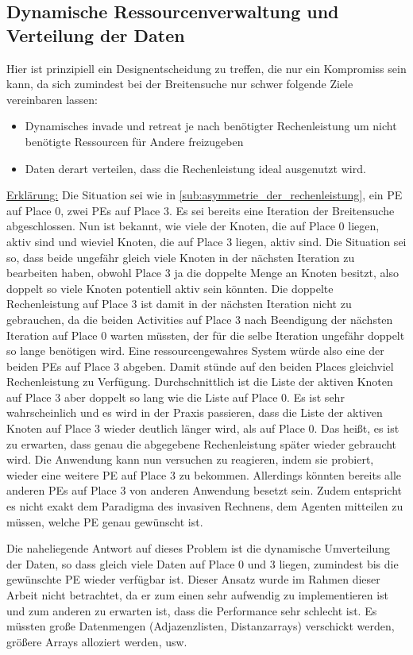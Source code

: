 \subsection{Dynamische Ressourcenverwaltung und Verteilung der Daten} %
\label{sub:dynamische_ressourcenverwaltung}
Hier ist prinzipiell ein Designentscheidung zu treffen, die nur ein Kompromiss sein kann, da sich zumindest bei der Breitensuche nur schwer folgende Ziele vereinbaren lassen:
\begin{itemize}
	\item Dynamisches invade und retreat je nach benötigter Rechenleistung um nicht benötigte Ressourcen für Andere freizugeben
	\item Daten derart verteilen, dass die Rechenleistung ideal ausgenutzt wird.
\end{itemize}
\underline{Erklärung:} Die Situation sei wie in \ref{sub:asymmetrie_der_rechenleistung}, ein PE auf Place 0, zwei PEs auf Place 3. Es sei bereits eine Iteration der Breitensuche abgeschlossen. Nun ist bekannt, wie viele der Knoten, die auf Place 0 liegen, aktiv sind und wieviel Knoten, die auf Place 3 liegen, aktiv sind. Die Situation sei so, dass beide ungefähr gleich viele Knoten in der nächsten Iteration zu bearbeiten haben, obwohl Place 3 ja die doppelte Menge an Knoten besitzt, also doppelt so viele Knoten potentiell aktiv sein könnten. Die doppelte Rechenleistung auf Place 3 ist damit in der nächsten Iteration nicht zu gebrauchen, da die beiden Activities auf Place 3 nach Beendigung der nächsten Iteration auf Place 0 warten müssten, der für die selbe Iteration ungefähr doppelt so lange benötigen wird. Eine ressourcengewahres System würde also eine der beiden PEs auf Place 3 abgeben. Damit stünde auf den beiden Places gleichviel Rechenleistung zu Verfügung. Durchschnittlich ist die Liste der aktiven Knoten auf Place 3 aber doppelt so lang wie die Liste auf Place 0. Es ist sehr wahrscheinlich und es wird in der Praxis passieren, dass die Liste der aktiven Knoten auf Place 3 wieder deutlich länger wird, als auf Place 0. Das heißt, es ist zu erwarten, dass genau die abgegebene Rechenleistung später wieder gebraucht wird. Die Anwendung kann nun versuchen zu reagieren, indem sie probiert, wieder eine weitere PE auf Place 3 zu bekommen. Allerdings könnten bereits alle anderen PEs auf Place 3 von anderen Anwendung besetzt sein. Zudem entspricht es nicht exakt dem Paradigma des invasiven Rechnens, dem Agenten mitteilen zu müssen, welche PE genau gewünscht ist.

Die naheliegende Antwort auf dieses Problem ist die dynamische Umverteilung der Daten, so dass gleich viele Daten auf Place 0 und 3 liegen, zumindest bis die gewünschte PE wieder verfügbar ist. Dieser Ansatz wurde im Rahmen dieser Arbeit nicht betrachtet, da er zum einen sehr aufwendig zu implementieren ist und zum anderen zu erwarten ist, dass die Performance sehr schlecht ist. Es müssten große Datenmengen (Adjazenzlisten, Distanzarrays) verschickt werden, größere Arrays alloziert werden, usw.

